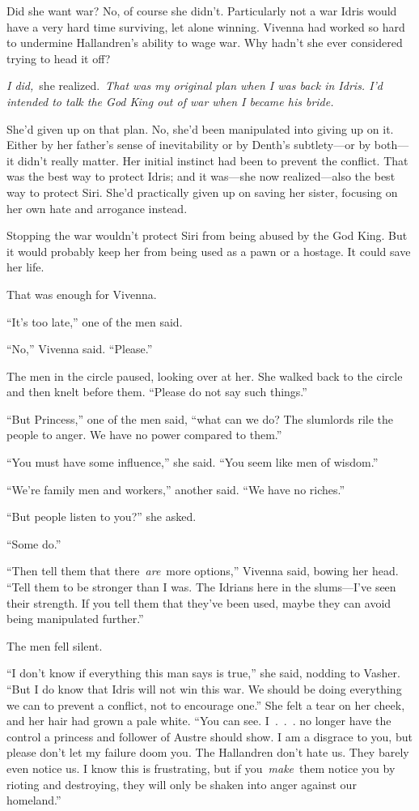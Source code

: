 Did she want war? No, of course she didn’t. Particularly not a war Idris would have a very hard time surviving, let alone winning. Vivenna had worked so hard to undermine Hallandren’s ability to wage war. Why hadn’t she ever considered trying to head it off?

\textit{I did,}~she realized.~\textit{That was my original plan when I was back in Idris. I’d intended to talk the God King out of war when I became his bride.}

She’d given up on that plan. No, she’d been manipulated into giving up on it. Either by her father’s sense of inevitability or by Denth’s subtlety—or by both—it didn’t really matter. Her initial instinct had been to prevent the conflict. That was the best way to protect Idris; and it was—she now realized—also the best way to protect Siri. She’d practically given up on saving her sister, focusing on her own hate and arrogance instead.

Stopping the war wouldn’t protect Siri from being abused by the God King. But it would probably keep her from being used as a pawn or a hostage. It could save her life.

That was enough for Vivenna.

“It’s too late,” one of the men said.

“No,” Vivenna said. “Please.”

The men in the circle paused, looking over at her. She walked back to the circle and then knelt before them. “Please do not say such things.”

“But Princess,” one of the men said, “what can we do? The slumlords rile the people to anger. We have no power compared to them.”

“You must have some influence,” she said. “You seem like men of wisdom.”

“We’re family men and workers,” another said. “We have no riches.”

“But people listen to you?” she asked.

“Some do.”

“Then tell them that there~\textit{are}~more options,” Vivenna said, bowing her head. “Tell them to be stronger than I was. The Idrians here in the slums—I’ve seen their strength. If you tell them that they’ve been used, maybe they can avoid being manipulated further.”

The men fell silent.

“I don’t know if everything this man says is true,” she said, nodding to Vasher. “But I do know that Idris will not win this war. We should be doing everything we can to prevent a conflict, not to encourage one.” She felt a tear on her cheek, and her hair had grown a pale white. “You can see. I~.~.~. no longer have the control a princess and follower of Austre should show. I am a disgrace to you, but please don’t let my failure doom you. The Hallandren don’t hate us. They barely even notice us. I know this is frustrating, but if you~\textit{make}~them notice you by rioting and destroying, they will only be shaken into anger against our homeland.”

